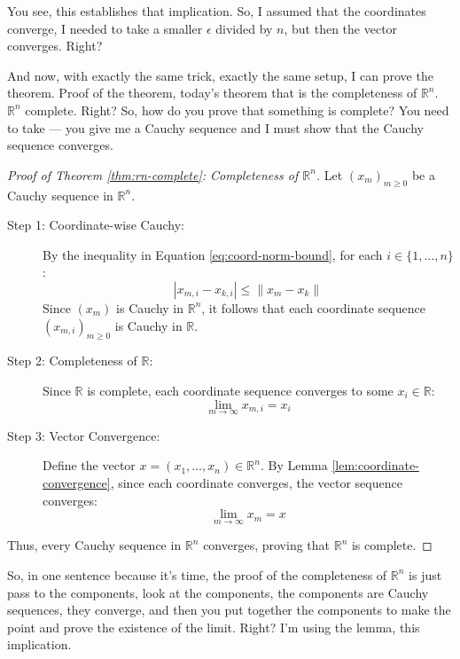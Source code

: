 \begin{spoken-clean}[00:24:45 - 00:25:20]
You see, this establishes that implication. So, I assumed that the coordinates converge, I needed to take a smaller $\epsilon$ divided by $n$, but then the vector converges. Right?
\end{spoken-clean}

\begin{spoken-clean}[00:25:20 - 00:26:35]
And now, with exactly the same trick, exactly the same setup, I can prove the theorem. Proof of the theorem, today's theorem that is the completeness of $\mathbb{R}^n$. $\mathbb{R}^n$ complete. Right? So, how do you prove that something is complete? You need to take --- you give me a Cauchy sequence and I must show that the Cauchy sequence converges.
\end{spoken-clean}

\begin{proof}[Proof of Theorem \ref{thm:rn-complete}: Completeness of \texorpdfstring{$\mathbb{R}^n$}{Rn}]
Let $(x_m)_{m \ge 0}$ be a Cauchy sequence in $\mathbb{R}^n$.
\begin{description}
    \item[Step 1: Coordinate-wise Cauchy:] By the inequality in Equation \ref{eq:coord-norm-bound}, for each $i \in \{1, \dots, n\}$:
    \[ |x_{m,i} - x_{k,i}| \le \|x_m - x_k\| \]
    Since $(x_m)$ is Cauchy in $\mathbb{R}^n$, it follows that each coordinate sequence $(x_{m,i})_{m \ge 0}$ is Cauchy in $\mathbb{R}$.
    \item[Step 2: Completeness of $\mathbb{R}$:] Since $\mathbb{R}$ is complete, each coordinate sequence converges to some $x_i \in \mathbb{R}$:
    \[ \lim_{m \to \infty} x_{m,i} = x_i \]
    \item[Step 3: Vector Convergence:] Define the vector $x = (x_1, \dots, x_n) \in \mathbb{R}^n$. By Lemma \ref{lem:coordinate-convergence}, since each coordinate converges, the vector sequence converges:
    \[ \lim_{m \to \infty} x_m = x \]
\end{description}
Thus, every Cauchy sequence in $\mathbb{R}^n$ converges, proving that $\mathbb{R}^n$ is complete.
\end{proof}

\begin{spoken-clean}[00:26:35 - 00:28:08]
So, in one sentence because it's time, the proof of the completeness of $\mathbb{R}^n$ is just pass to the components, look at the components, the components are Cauchy sequences, they converge, and then you put together the components to make the point and prove the existence of the limit. Right? I'm using the lemma, this implication.
\end{spoken-clean}

